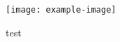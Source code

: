 \documentclass{beamer}
\begin{document}
\begin{frame}
\begin{figure}
\texttt{[image: example-image]}
\caption{test}
\end{figure}
\end{frame}
\end{document}
